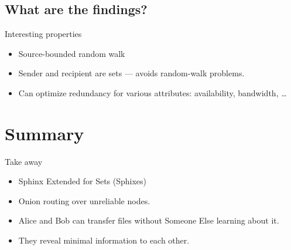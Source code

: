\subsection{What are the findings?}

\begin{frame}
  \begin{block}{Interesting properties}
    \begin{itemize}
      \item Source-bounded random walk
      \item Sender and recipient are sets --- avoids random-walk problems.
      \item Can optimize redundancy for various attributes: availability, 
        bandwidth, \dots
    \end{itemize}
  \end{block}
\end{frame}


\section{Summary}

\begin{frame}
  \begin{block}{Take away}
    \begin{itemize}
      \item Sphinx Extended for Sets (Sphixes)
      \item Onion routing over unreliable nodes.
      \item Alice and Bob can transfer files without Someone Else learning about 
        it.
      \item They reveal minimal information to each other.
    \end{itemize}
  \end{block}
\end{frame}



\begin{frame}[allowframebreaks]
  \printbibliography
\end{frame}
